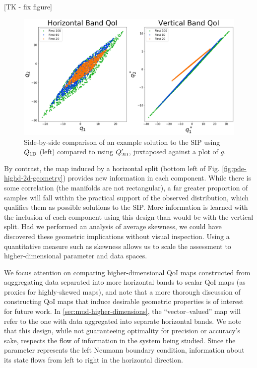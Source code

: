 [TK - fix figure]
\begin{figure}
  \includegraphics[width=0.95\linewidth]{figures/pde-highd/pde-highd_geom_D2.png}
\caption{
Side-by-side comparison of an example solution to the SIP using $Q_\text{1D}$ (left) compared to using $Q_\text{2D}^\prime$, juxtaposed against a plot of $g$.
}
\label{fig:pde-highd-2d-scalar-vs-alt}
\end{figure}

By contrast, the map induced by a horizontal split (bottom left of Fig. \ref{fig:pde-highd-2d-geometry}) provides new information in each component.
While there is some correlation (the manifolds are not rectangular), a far greater proportion of samples will fall within the practical support of the observed distribution, which qualifies them as possible solutions to the SIP.
More information is learned with the inclusion of each component using this design than would be with the vertical split.
Had we performed an analysis of average skewness, we could have discovered these geometric implications without visual inspection.
Using a quantitative measure such as skewness allows us to scale the assessment to higher-dimensional parameter and data spaces.

We focus attention on comparing higher-dimensional QoI maps constructed from aqggregating data separated into more horizontal bands to scalar QoI maps (as proxies for highly-skewed maps), and note that a more thorough discussion of constructing QoI maps that induce desirable geometric properties is of interest for future work.
In \ref{sec:mud-higher-dimensions}, the ``vector--valued'' map will refer to the one with data aggregated into separate horizontal bands.
We note that this design, while not guaranteeing optimality for precision or accuracy's sake, respects the flow of information in the system being studied.
Since the parameter represents the left Neumann boundary condition, information about its state flows from left to right in the horizontal direction.

\FloatBarrier
